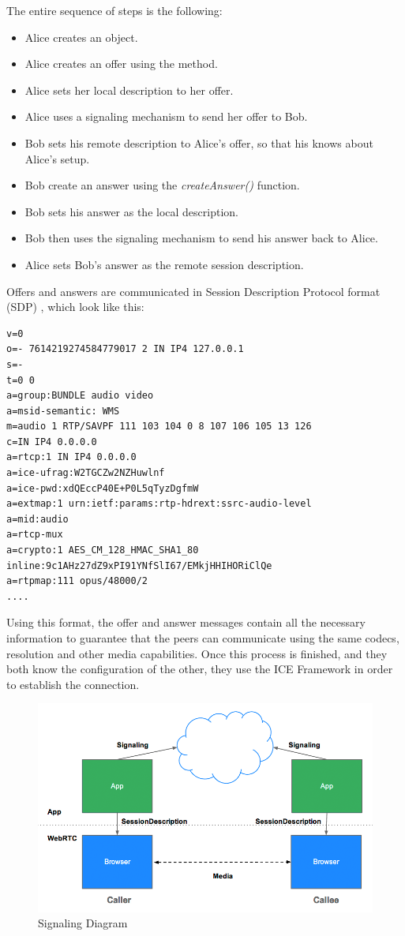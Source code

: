 The entire sequence of steps is the following:
\begin{itemize}
	\item Alice creates an \RTCPeerConnection object.
	\item Alice creates an offer using the \RTCPeerConnection \createOffer method.
	\item Alice sets her local description to her offer.
	\item Alice uses a signaling mechanism to send her offer to Bob.
	\item Bob sets his remote description to Alice's offer, so that his \RTCPeerConnection knows about Alice's setup.
	\item Bob create an answer using the \textit{createAnswer()} function.
	\item Bob sets his answer as the local description.
	\item Bob then uses the signaling mechanism to send his answer back to Alice.
	\item Alice sets Bob's answer as the remote session description.
\end{itemize}
Offers and answers are communicated in Session Description Protocol format (SDP) \cite{sdp}, which look like this:
\begin{verbatim}
v=0
o=- 7614219274584779017 2 IN IP4 127.0.0.1
s=-
t=0 0
a=group:BUNDLE audio video
a=msid-semantic: WMS
m=audio 1 RTP/SAVPF 111 103 104 0 8 107 106 105 13 126
c=IN IP4 0.0.0.0
a=rtcp:1 IN IP4 0.0.0.0
a=ice-ufrag:W2TGCZw2NZHuwlnf
a=ice-pwd:xdQEccP40E+P0L5qTyzDgfmW
a=extmap:1 urn:ietf:params:rtp-hdrext:ssrc-audio-level
a=mid:audio
a=rtcp-mux
a=crypto:1 AES_CM_128_HMAC_SHA1_80 inline:9c1AHz27dZ9xPI91YNfSlI67/EMkjHHIHORiClQe
a=rtpmap:111 opus/48000/2
....
\end{verbatim}
Using this format, the offer and answer messages contain all the necessary information to guarantee that the peers can communicate using the same codecs, resolution and other media capabilities. 
Once this process is finished, and they both know the configuration of the other, they use the ICE Framework in order to establish the connection.

\begin{figure}[ht]
  \centering
  \includegraphics[keepaspectratio=true, width=\textwidth]{images/jsep}\caption{Signaling Diagram}
  \label{fig:jsep}
\end{figure}

